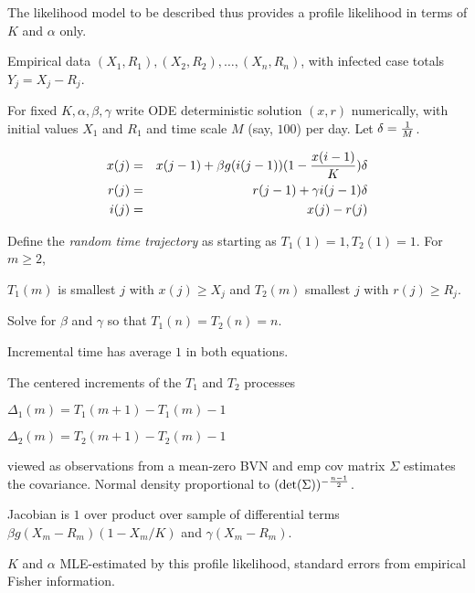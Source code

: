 \documentclass{article}
\begin{document}
\noindent The likelihood model to be described thus provides a profile likelihood in terms of $K$ and $\alpha$ only.

\bigskip

\noindent Empirical data $(X_1,R_1), (X_2,R_2), \dots, (X_n, R_n)$, with infected case totals $Y_j=X_j-R_j$. 

\bigskip

\noindent For fixed $K, \alpha, \beta, \gamma$ write ODE deterministic solution $(x,r)$ numerically, with initial values $X_1$ and $R_1$ and time scale $M$ (say, $100$) per day. Let $\delta={1 \over M}$.   

\newpage

\begin{eqnarray}
x(j)&=&x(j-1)+\beta g(i(j-1))(1-{{x(i-1)} \over K}) \delta \nonumber \\
r(j)&=&r(j-1)+\gamma i(j-1) \delta \nonumber \\
i(j)&=&x(j)-r(j)\nonumber
\end{eqnarray}

\bigskip

\noindent Define the {\em random time trajectory} as starting as $T_1(1)=1, T_2(1)=1$. For $m \ge 2$,

\bigskip

\noindent $T_1(m)$ is smallest $j$ with $x(j) \ge X_j$ and $T_2(m)$ smallest $j$ with $r(j) \ge R_j$.

\bigskip

\noindent Solve for $\beta$ and $\gamma$ so that $T_1(n)=T_2(n)=n$. 

\noindent Incremental time has average $1$ in both equations. 

\newpage

\noindent The centered increments of the $T_1$ and $T_2$ processes

\bigskip

\noindent $\Delta_1(m)=T_1(m+1)-T_1(m)-1$ 

\noindent $\Delta_2(m)=T_2(m+1)-T_2(m)-1$

\noindent viewed as observations from a mean-zero BVN and emp cov matrix $\Sigma$ estimates the covariance.
Normal density proportional to $(\det(\Sigma))^{-{{n-1} \over 2}}$.

Jacobian is $1$ over product over sample of differential terms $\beta g(X_m-R_m)(1-X_m/K)$ and $\gamma (X_m-R_m)$.

\bigskip

\noindent $K$ and $\alpha$ MLE-estimated by this profile likelihood, standard errors from empirical Fisher information.
\end{document}
